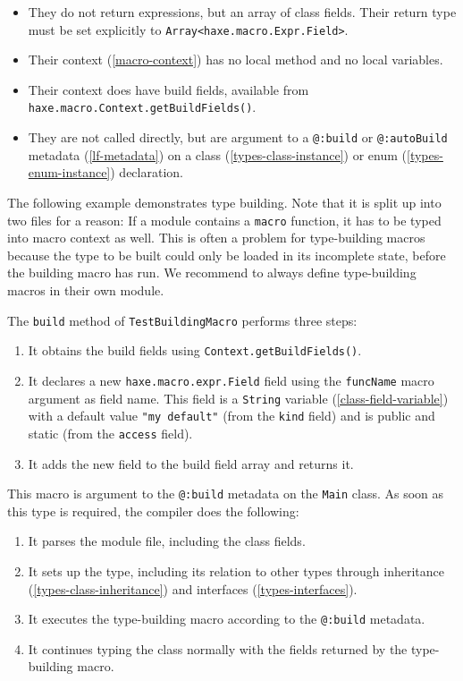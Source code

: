 \documentclass[a4paper,oneside]{book}
\newcommand{\type}[1]{\texttt{#1}}
\newcommand{\expr}[1]{\texttt{#1}}
\newcommand{\tref}[2]{#1 (\ref{#2})}
\newcommand{\haxe}[2][]{%
}
\begin{document}
\begin{itemize}
	\item They do not return expressions, but an array of class fields. Their return type must be set explicitly to \type{Array<haxe.macro.Expr.Field>}.
	\item Their \tref{context}{macro-context} has no local method and no local variables.
	\item Their context does have build fields, available from \expr{haxe.macro.Context.getBuildFields()}.
	\item They are not called directly, but are argument to a \expr{@:build} or \expr{@:autoBuild} \tref{metadata}{lf-metadata} on a \tref{class}{types-class-instance} or \tref{enum}{types-enum-instance} declaration.
\end{itemize}

The following example demonstrates type building. Note that it is split up into two files for a reason: If a module contains a \expr{macro} function, it has to be typed into macro context as well. This is often a problem for type-building macros because the type to be built could only be loaded in its incomplete state, before the building macro has run. We recommend to always define type-building macros in their own module.

\haxe{assets/TypeBuildingMacro.hx}
\haxe{assets/TypeBuilding.hx}

The \expr{build} method of \type{TestBuildingMacro} performs three steps:

\begin{enumerate}
	\item It obtains the build fields using \expr{Context.getBuildFields()}.
	\item It declares a new \type{haxe.macro.expr.Field} field using the \expr{funcName} macro argument as field name. This field is a \type{String} \tref{variable}{class-field-variable} with a default value \expr{"my default"} (from the \expr{kind} field) and is public and static (from the \expr{access} field).
	\item It adds the new field to the build field array and returns it.
\end{enumerate}

This macro is argument to the \expr{@:build} metadata on the \type{Main} class. As soon as this type is required, the compiler does the following:

\begin{enumerate}
	\item It parses the module file, including the class fields.
	\item It sets up the type, including its relation to other types through \tref{inheritance}{types-class-inheritance} and \tref{interfaces}{types-interfaces}.
	\item It executes the type-building macro according to the \expr{@:build} metadata.
	\item It continues typing the class normally with the fields returned by the type-building macro.
\end{enumerate}
\end{document}

